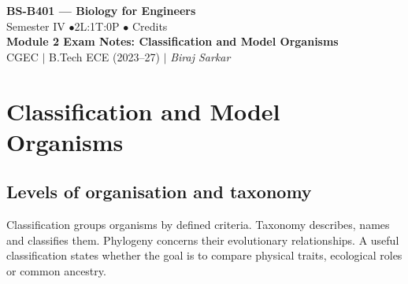 \documentclass[12pt,a4paper]{article}
\begin{document}
\begin{center}
  {\LARGE\bfseries\color{myred} BS-B401 --- Biology for Engineers}\\[5pt]
  {\normalsize\color{mydark} Semester IV \quad$\bullet$\quad 2L:1T:0P \quad$\bullet$ Credits}\\[3pt]
  {\normalsize\color{myteal}\textbf{Module 2 Exam Notes: Classification and Model Organisms}}\\[3pt]
  {\small\color{mydark} CGEC \;$|$\; B.Tech ECE (2023--27) \;$|$\; \textit{Biraj Sarkar}}
\end{center}
\vspace{2pt}
\noindent{\color{myred}\rule{\linewidth}{1.5pt}}
\vspace{2pt}

\hypersetup{linkcolor=mydark}
\tableofcontents
\hypersetup{linkcolor=myteal}
\newpage

\section{Classification and Model Organisms}
\subsection{Levels of organisation and taxonomy}
\begin{tcolorbox}[defbox, title={Classification}]
Classification groups organisms by defined criteria. Taxonomy describes, names and classifies them. Phylogeny concerns their evolutionary relationships. A useful classification states whether the goal is to compare physical traits, ecological roles or common ancestry.
\end{tcolorbox}
\end{document}
